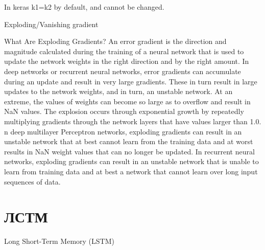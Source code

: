 In keras k1=k2 by default, and cannot be changed.

Exploding/Vanishing gradient

What Are Exploding Gradients?
An error gradient is the direction and magnitude calculated during the training of a neural network that is used to update the network weights in the right direction and by the right amount. In deep networks or recurrent neural networks, error gradients can accumulate during an update and result in very large gradients. These in turn result in large updates to the network weights, and in turn, an unstable network. At an extreme, the values of weights can become so large as to overflow and result in NaN values.
The explosion occurs through exponential growth by repeatedly multiplying gradients through the network layers that have values larger than 1.0.
n deep multilayer Perceptron networks, exploding gradients can result in an unstable network that at best cannot learn from the training data and at worst results in NaN weight values that can no longer be updated.
In recurrent neural networks, exploding gradients can result in an unstable network that is unable to learn from training data and at best a network that cannot learn over long input sequences of data.

\section{ЛСТМ}

Long Short-Term Memory (LSTM)

